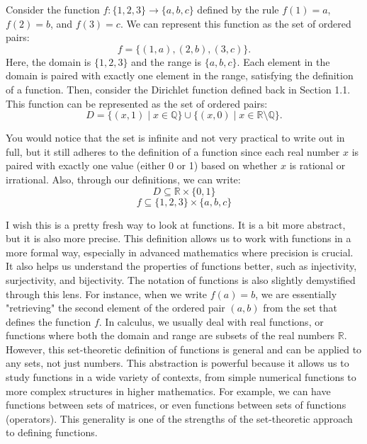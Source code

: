\begin{example}
    Consider the function \(f: \{1, 2, 3\} \to \{a, b, c\}\) defined by the rule \(f(1) = a\), \(f(2) = b\), and \(f(3) = c\). We can represent this function as the set of ordered pairs:
    \begin{equation}
    f = \{(1, a), (2, b), (3, c)\}.
    \end{equation}
    Here, the domain is \(\{1, 2, 3\}\) and the range is \(\{a, b, c\}\). Each element in the domain is paired with exactly one element in the range, satisfying the definition of a function. Then, consider the Dirichlet function defined back in Section 1.1. This function can be represented as the set of ordered pairs:
    \begin{equation}
      D = \{(x, 1) \mid x \in \mathbb{Q}\} \cup \{(x, 0) \mid x \in \mathbb{R} \setminus \mathbb{Q}\}.
    \end{equation}

    You would notice that the set is infinite and not very practical to write out in full, but it still adheres to the definition of a function since each real number \(x\) is paired with exactly one value (either 0 or 1) based on whether \(x\) is rational or irrational. Also, through our definitions, we can write:
    \begin{equation*}
      D \subseteq \mathbb{R} \times \{0, 1\}
    \end{equation*}
    \begin{equation*}
      f \subseteq \{1, 2, 3\} \times \{a, b, c\}
    \end{equation*}
\end{example}


I wish this is a pretty fresh way to look at functions. It is a bit more abstract, but it is also more precise. This definition allows us to work with functions in a more formal way, especially in advanced mathematics where precision is crucial. It also helps us understand the properties of functions better, such as injectivity, surjectivity, and bijectivity. The notation of functions is also slightly demystified through this lens. For instance, when we write \(f(a) = b\), we are essentially "retrieving" the second element of the ordered pair \((a,b)\) from the set that defines the function \(f\). In calculus, we usually deal with real functions, or functions where both the domain and range are subsets of the real numbers \(\mathbb{R}\). However, this set-theoretic definition of functions is general and can be applied to any sets, not just numbers. This abstraction is powerful because it allows us to study functions in a wide variety of contexts, from simple numerical functions to more complex structures in higher mathematics. For example, we can have functions between sets of matrices, or even functions between sets of functions (operators). This generality is one of the strengths of the set-theoretic approach to defining functions. 



